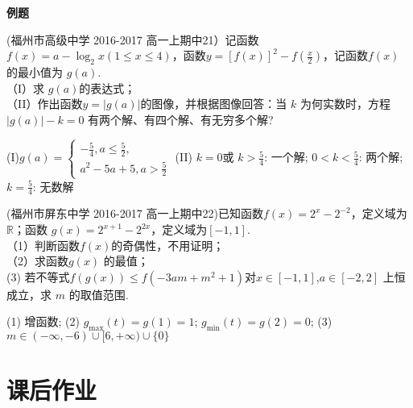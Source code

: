 \begin{exercise}{\large \bf 例\hspace{0.6em}题}
\item
(福州市高级中学 2016-2017 高一上期中21）记函数 $f (x )=a-\log_2{x}(1\leq x\leq 4)$，函数$y=[f(x)]^2-f(\frac x2)$，记函数$f(x)$ 的最小值为 $g( a)$.\\
（I）求 $g( a) $的表达式；\\
（II）作出函数$y=|g(a)|$的图像，并根据图像回答：当 $k$ 为何实数时，方程$|g( a)|-k=0$ 有两个解、有四个解、有无穷多个解?
\begin{answer}
(I)$g(a)=\begin{cases}-\frac54,a\leq\frac52,\\a^2-5a+5,a>\frac52\end{cases} $
(II) $k=0$或 $k>\frac54 $: 一个解;  $0<k<\frac54$: 两个解;   $k=\frac54$: 无数解
\end{answer}
\vspace{20em}

\item
(福州市屏东中学 2016-2017 高一上期中22)已知函数$f(x)=2^x-2^{-2} $，定义域为$\mathbb{R} $；函数 $g(x)=2^{x+1}-2^{2x} $，定义域为$[-1,1] $.\\
（1）判断函数$f(x) $的奇偶性，不用证明；\\
（2）求函数$g(x) $ 的最值；\\
 (3) 若不等式$f(g(x))\leq f(-3am+m^2+1) $对$x\in[-1,1] $,$a\in[-2,2] $ 上恒成立，求 $m$ 的取值范围.
 \begin{answer}
 (1) 增函数; (2) $g_{\max}(t)=g(1)=1 $; $g_{\min}(t)=g(2)=0 $; (3) $m\in (-\infty,-6)\cup[6,+\infty)\cup\{0\} $
\end{answer}
\vspace{20em}


\end{exercise}

\newpage
\section{课后作业}

